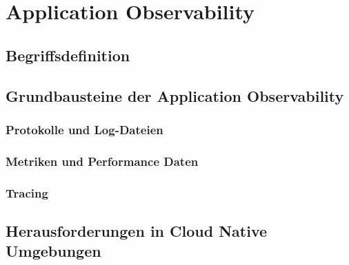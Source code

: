 \newpage
\section{Application Observability}\label{lab:application_observability}
\subsection{Begriffsdefinition}
\subsection{Grundbausteine der Application Observability}
\subsubsection{Protokolle und Log-Dateien}
\subsubsection{Metriken und Performance Daten}
\subsubsection{Tracing}
\subsection{Herausforderungen in Cloud Native Umgebungen}